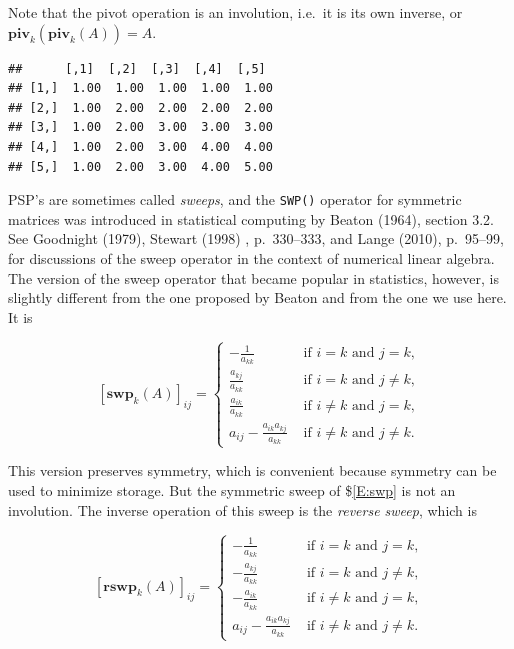 \documentclass[12pt,]{article}
\newenvironment{Shaded}{\begin{snugshade}}{\end{snugshade}}
\newcommand{\KeywordTok}[1]{\textcolor[rgb]{0.13,0.29,0.53}{\textbf{#1}}}
\newcommand{\DecValTok}[1]{\textcolor[rgb]{0.00,0.00,0.81}{#1}}
\newcommand{\OperatorTok}[1]{\textcolor[rgb]{0.81,0.36,0.00}{\textbf{#1}}}
\newcommand{\NormalTok}[1]{#1}
\begin{document}
Note that the pivot operation is an involution, i.e.~it is its own
inverse, or \(\mathbf{piv}_k(\mathbf{piv}_k(A))=A\).

\begin{Shaded}
\end{Shaded}

\begin{verbatim}
##      [,1]  [,2]  [,3]  [,4]  [,5] 
## [1,]  1.00  1.00  1.00  1.00  1.00
## [2,]  1.00  2.00  2.00  2.00  2.00
## [3,]  1.00  2.00  3.00  3.00  3.00
## [4,]  1.00  2.00  3.00  4.00  4.00
## [5,]  1.00  2.00  3.00  4.00  5.00
\end{verbatim}

PSP's are sometimes called \emph{sweeps}, and the \texttt{SWP()}
operator for symmetric matrices was introduced in statistical computing
by Beaton (1964), section 3.2. See Goodnight (1979), Stewart (1998) ,
p.~330--333, and Lange (2010), p.~95--99, for discussions of the sweep
operator in the context of numerical linear algebra. The version of the
sweep operator that became popular in statistics, however, is slightly
different from the one proposed by Beaton and from the one we use here.
It is

\begin{equation}\label{E:swp}
[\mathbf{swp}_k(A)]_{ij}=
\begin{cases}
-\frac{1}{a_{kk}}&\text{ if }i=k\text{ and }j=k,\\
\frac{a_{kj}}{a_{kk}}&\text{ if }i=k\text{ and }j\not=k,\\
\frac{a_{ik}}{a_{kk}}&\text{ if }i\not=k\text{ and }j=k,\\
a_{ij}-\frac{a_{ik}a_{kj}}{a_{kk}}&\text{ if }i\not=k\text{ and }j\not=k.
\end{cases}
\end{equation}

This version preserves symmetry, which is convenient because symmetry
can be used to minimize storage. But the symmetric sweep of
\$\eqref{E:swp} is not an involution. The inverse operation of this
sweep is the \emph{reverse sweep}, which is

\begin{equation}\label{E:rswp}
[\mathbf{rswp}_k(A)]_{ij}=
\begin{cases}
-\frac{1}{a_{kk}}&\text{ if }i=k\text{ and }j=k,\\
-\frac{a_{kj}}{a_{kk}}&\text{ if }i=k\text{ and }j\not=k,\\
-\frac{a_{ik}}{a_{kk}}&\text{ if }i\not=k\text{ and }j=k,\\
a_{ij}-\frac{a_{ik}a_{kj}}{a_{kk}}&\text{ if }i\not=k\text{ and }j\not=k.
\end{cases}
\end{equation}
\end{document}
